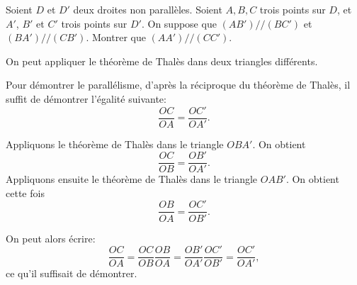 \begin{exo}
Soient $D$ et $D'$ deux droites non parallèles.
Soient $A, B, C$ trois points sur $D$, et $A'$, $B'$ et $C'$ trois points sur $D'$.
On suppose que $(AB') // (BC')$ et $(BA') // (CB')$.
Montrer que $(AA') // (CC')$.
\begin{hint}
On peut appliquer le théorème de Thalès dans deux triangles différents.
\end{hint}
\begin{sol}
Pour démontrer le parallélisme, d'après la réciproque du théorème de Thalès, il suffit de démontrer l'égalité suivante:
\[\frac{OC}{OA}=\frac{OC'}{OA'}.\]

Appliquons le théorème de Thalès dans le triangle $OBA'$. On obtient
\[ \frac{OC}{OB} = \frac{OB'}{OA'}.\]
Appliquons ensuite le théorème de Thalès dans le triangle $OAB'$. On obtient cette fois
\[ \frac{OB}{OA} = \frac{OC'}{OB'}.\]

On peut alors écrire:
\[ \frac{OC}{OA}
=\frac{OC}{OB}\frac{OB}{OA} 
= \frac{OB'}{OA'}\frac{OC'}{OB'}
=  \frac{OC'}{OA'},\]
ce qu'il suffisait de démontrer.
\end{sol}
\end{exo}  




